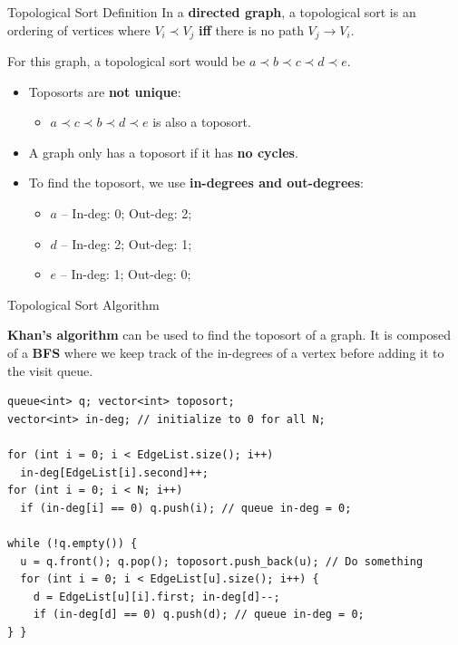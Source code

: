 \begin{frame}{Topological Sort Definition}
  In a {\bf directed graph}, a topological sort is an ordering of vertices where $V_i \prec V_j$ {\bf iff} there is no path $V_j \to V_i$.\bigskip
  \begin{center}
    
  \end{center}
  For this graph, a topological sort would be $a \prec b \prec c \prec d \prec e$.\bigskip

  \begin{itemize}
    \item Toposorts are {\bf not unique}:
    \begin{itemize}
      \item $a \prec c \prec b \prec d \prec e$ is also a toposort.
    \end{itemize}
    \item A graph only has a toposort if it has {\bf no cycles}.
    \item To find the toposort, we use {\bf in-degrees and out-degrees}:
    \begin{itemize}
      \item $a$ -- In-deg: 0; Out-deg: 2;
      \item $d$ -- In-deg: 2; Out-deg: 1;
      \item $e$ -- In-deg: 1; Out-deg: 0;
    \end{itemize}
  \end{itemize}
\end{frame}

\begin{frame}[fragile]{Topological Sort Algorithm}

  {\bf Khan's algorithm} can be used to find the toposort of a graph. It is composed of a {\bf BFS} where we keep track of the in-degrees of a vertex before adding it to the visit queue.

\begin{exampleblock}{}
  {\smaller
\begin{verbatim}
queue<int> q; vector<int> toposort;
vector<int> in-deg; // initialize to 0 for all N;

for (int i = 0; i < EdgeList.size(); i++)
  in-deg[EdgeList[i].second]++;
for (int i = 0; i < N; i++)
  if (in-deg[i] == 0) q.push(i); // queue in-deg = 0;

while (!q.empty()) {
  u = q.front(); q.pop(); toposort.push_back(u); // Do something
  for (int i = 0; i < EdgeList[u].size(); i++) {
    d = EdgeList[u][i].first; in-deg[d]--;
    if (in-deg[d] == 0) q.push(d); // queue in-deg = 0;
} }
\end{verbatim}}
  \end{exampleblock}
\end{frame}

